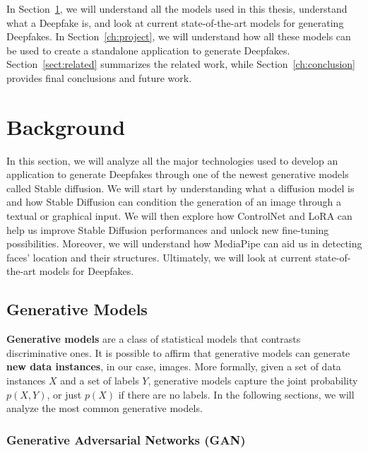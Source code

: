 \documentclass[preprint]{elsarticle}
\begin{document}

In Section~\ref{ch:background}, we will understand all the models used in this thesis, understand what a Deepfake is, and look at current state-of-the-art models for generating Deepfakes.
In Section~\ref{ch:project}, we will understand how all these models can be used to create a standalone application to generate Deepfakes. Section~\ref{sect:related} summarizes the related work, while Section~\ref{ch:conclusion} provides final conclusions and future work.


\section{Background}\label{ch:background}


In this section, we will analyze all the major technologies used to develop an application to generate 
Deepfakes through one of the newest generative models called Stable diffusion. 
We will start by understanding what a diffusion model is and how Stable Diffusion can condition the 
generation of an image through a textual or graphical input. 
We will then explore how ControlNet and LoRA can help us improve Stable Diffusion performances and unlock new fine-tuning possibilities. 
Moreover, we will understand how MediaPipe can aid us in detecting faces' location and their structures. 
Ultimately, we will look at current state-of-the-art models for Deepfakes.



\subsection{Generative Models} \label{sec:imggenmodels}
\textbf{Generative models} are a class of statistical models that contrasts discriminative ones. 
It is possible to affirm that generative models can generate \textbf{new data instances}, 
in our case, images. 
More formally, given a set of data instances $X$ and a set of labels $Y$, 
generative models capture the joint probability $p(X, Y)$, or just $p(X)$ if there are no labels. 
In the following sections, we will analyze the most common generative models.


\subsubsection{Generative Adversarial Networks (GAN)}\label{sec:gan}
\end{document}

